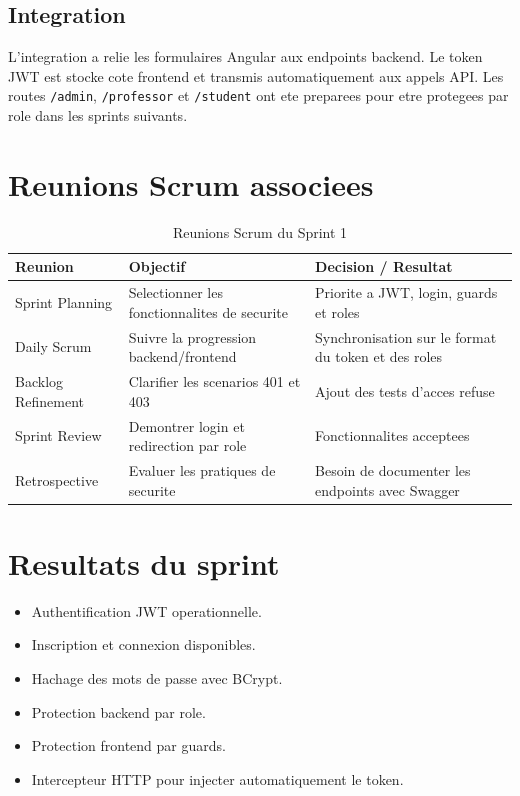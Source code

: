 \documentclass[12pt,a4paper]{report}
\begin{document}
\subsection{Integration}

L'integration a relie les formulaires Angular aux endpoints backend. Le token JWT est stocke cote frontend et transmis automatiquement aux appels API. Les routes \texttt{/admin}, \texttt{/professor} et \texttt{/student} ont ete preparees pour etre protegees par role dans les sprints suivants.

\section{Reunions Scrum associees}

\begin{table}[H]
\centering
\caption{Reunions Scrum du Sprint 1}
\begin{tabular}{|p{3.5cm}|p{6cm}|p{4cm}|}
\hline
\textbf{Reunion} & \textbf{Objectif} & \textbf{Decision / Resultat} \\
\hline
Sprint Planning & Selectionner les fonctionnalites de securite & Priorite a JWT, login, guards et roles \\
\hline
Daily Scrum & Suivre la progression backend/frontend & Synchronisation sur le format du token et des roles \\
\hline
Backlog Refinement & Clarifier les scenarios 401 et 403 & Ajout des tests d'acces refuse \\
\hline
Sprint Review & Demontrer login et redirection par role & Fonctionnalites acceptees \\
\hline
Retrospective & Evaluer les pratiques de securite & Besoin de documenter les endpoints avec Swagger \\
\hline
\end{tabular}
\end{table}

\section{Resultats du sprint}

\begin{itemize}[itemsep=0.3em]
    \item Authentification JWT operationnelle.
    \item Inscription et connexion disponibles.
    \item Hachage des mots de passe avec BCrypt.
    \item Protection backend par role.
    \item Protection frontend par guards.
    \item Intercepteur HTTP pour injecter automatiquement le token.
\end{itemize}
\end{document}
